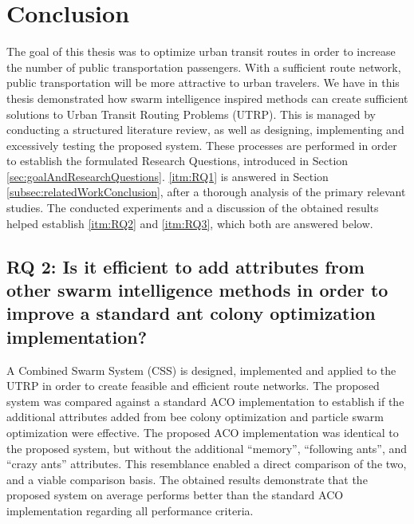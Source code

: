\section{Conclusion}
\label{sec:conclusion}

The goal of this thesis was to optimize urban transit routes in order to increase the number of public transportation passengers. With a sufficient route network, public transportation will be more attractive to urban travelers. We have in this thesis demonstrated how swarm intelligence inspired methods can create sufficient solutions to Urban Transit Routing Problems (UTRP). This is managed by conducting a structured literature review\citep{kofod2014}, as well as designing, implementing and excessively testing the proposed system. These processes are performed in order to establish the formulated Research Questions, introduced in Section \vref{sec:goalAndResearchQuestions}. \ref{itm:RQ1} is answered in Section \vref{subsec:relatedWorkConclusion}, after a thorough analysis of the primary relevant studies. The conducted experiments and a discussion of the obtained results helped establish \ref{itm:RQ2} and \ref{itm:RQ3}, which both are answered below. 


\subsection*{RQ 2: Is it efficient to add attributes from other swarm intelligence methods in order to improve a standard ant colony optimization implementation?}

A Combined Swarm System (CSS) is designed, implemented and applied to the UTRP in order to create feasible and efficient route networks. The proposed system was compared against a standard ACO implementation to establish if the additional attributes added from bee colony optimization and particle swarm optimization were effective. The proposed ACO implementation was identical to the proposed system, but without the additional ``memory'', ``following ants'', and ``crazy ants'' attributes. This resemblance enabled a direct comparison of the two, and a viable comparison basis. The obtained results demonstrate that the proposed system on average performs better than the standard ACO implementation regarding all performance criteria.

